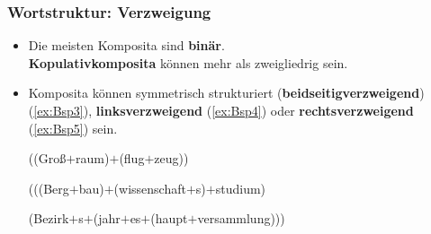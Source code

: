 \begin{frame}
\frametitle{Wortstruktur: Verzweigung}

\begin{itemize}
	\item Die meisten Komposita sind \textbf{binär}. \\
	\textbf{Kopulativkomposita} können mehr als zweigliedrig sein.
\begin{figure}
	\centering
\scalebox{.8}{
\begin{forest}
		[A
			[A [rot]]
			[A [rot]]
			[A [grün]]
		]
\end{forest}	
}
\end{figure}
	
\pause 
	
	\item Komposita können symmetrisch strukturiert (\textbf{beidseitigverzweigend}) (\ref{ex:Bsp3}), \textbf{linksverzweigend} (\ref{ex:Bsp4}) oder \textbf{rechtsverzweigend} (\ref{ex:Bsp5}) sein.
	
	\ea \label{ex:Bsp3} {((Groß$+$raum)$+$(flug$+$zeug))}
	
	\ex \label{ex:Bsp4} {(((Berg$+$bau)$+$(wissenschaft$+$s)$+$studium)}
	
	\ex \label{ex:Bsp5} (Bezirk$+$s$+$(jahr$+$es$+$(haupt$+$versammlung)))
	\z

	
\end{itemize}

%

\end{frame}


